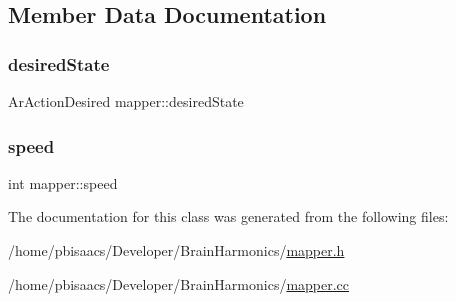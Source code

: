 \subsection{Member Data Documentation}
\mbox{\label{classmapper_ad12cf719b7ef6c4399ca718cdc9f270d}} 
\subsubsection{\texorpdfstring{desired\+State}{desiredState}}
{\footnotesize\ttfamily Ar\+Action\+Desired mapper\+::desired\+State}

\mbox{\label{classmapper_a2764f9fead6392132485f3545c18b629}} 
\subsubsection{\texorpdfstring{speed}{speed}}
{\footnotesize\ttfamily int mapper\+::speed\hspace{0.3cm}{\ttfamily [protected]}}



The documentation for this class was generated from the following files\+:\begin{DoxyCompactItemize}
\item 
/home/pbisaacs/\+Developer/\+Brain\+Harmonics/\mbox{\hyperlink{mapper_8h}{mapper.\+h}}\item 
/home/pbisaacs/\+Developer/\+Brain\+Harmonics/\mbox{\hyperlink{mapper_8cc}{mapper.\+cc}}\end{DoxyCompactItemize}
